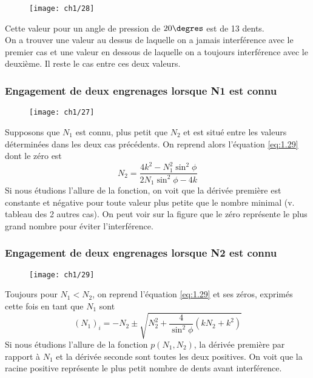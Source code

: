 		\begin{wrapfigure}[3]{r}{4cm}
		\vspace{-5mm}
		\texttt{[image: ch1/28]}
		\end{wrapfigure}				
		Cette valeur pour un angle de pression de $20\degres$ est de 13 dents. \\
		On a trouver une valeur au dessus de laquelle on a jamais interférence avec le premier cas et une valeur en dessous de laquelle on a toujours interférence avec le deuxième. Il reste le cas entre ces deux valeurs. 
		
		\subsubsection{Engagement de deux engrenages lorsque N1 est connu}
		\begin{wrapfigure}[8]{l}{3.8cm}
		\vspace{-5mm}
		\texttt{[image: ch1/27]}
		\end{wrapfigure}		
		Supposons que $N_1$ est connu, plus petit que $N_2$ et est situé entre les valeurs déterminées dans les deux cas précédents. On reprend alors l'équation \autoref{eq:1.29} dont le zéro est 
			\begin{equation}
				N_2 = \frac{4k^2 - N_1 ^2 \sin ^2 \phi}{2 N_1 \sin ^2 \phi - 4k}
				\label{eq:1.33}
			\end{equation}
			Si nous étudions l'allure de la fonction, on voit que la dérivée première est constante et négative pour toute valeur plus petite que le nombre minimal (v. tableau des 2 autres cas). On peut voir sur la figure que le zéro représente le plus grand nombre pour éviter l'interférence. 
			
		\subsubsection{Engagement de deux engrenages lorsque N2 est connu}
			\begin{wrapfigure}[5]{l}{4cm}
			\vspace{-5mm}
			\texttt{[image: ch1/29]}
			\end{wrapfigure}					
			Toujours pour $N_1<N_2$, on reprend l'équation \autoref{eq:1.29} et ses zéros, exprimés cette fois en tant que $N_1$ sont
			\begin{equation}
				(N_1)_i = - N_2 \pm \sqrt{N_2^2 + \frac{4}{\sin ^2 \phi}(kN_2 +k^2)}
				\label{eq:1.34}
			\end{equation}
			Si nous étudions l'allure de la fonction $p(N_1,N_2)$, la dérivée première par rapport à $N_1$ et la dérivée seconde sont toutes les deux positives. On voit que la racine positive représente le plus petit nombre de dents avant interférence. \\
			
